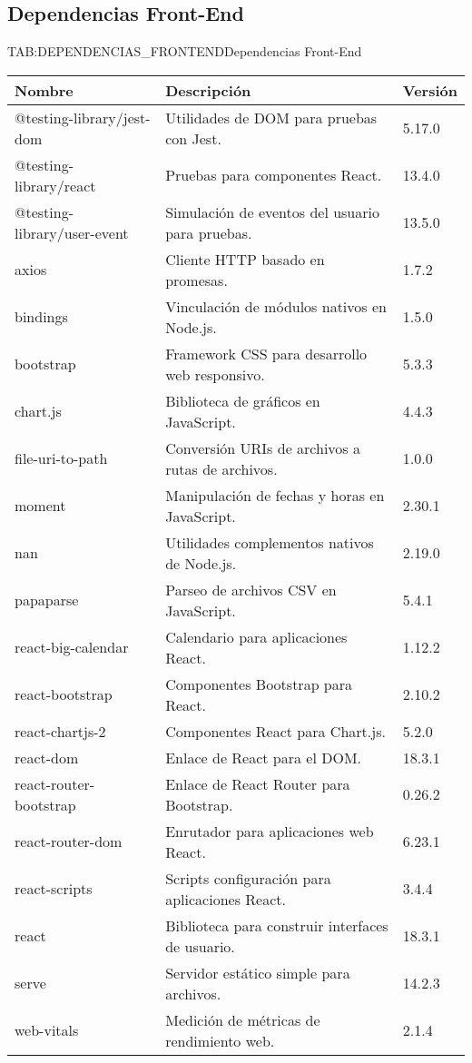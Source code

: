 \newpage

\subsection{Dependencias Front-End}

\begin{table}[Dependencias Front-End]{TAB:DEPENDENCIAS_FRONTEND}{Dependencias Front-End}
  \begin{tabular}{|p{6cm}|p{8cm}|p{2cm}|}
    \hline
    \textbf{Nombre} & \textbf{Descripción} & \textbf{Versión} \\
    \hline
    @testing-library/jest-dom & Utilidades de DOM para pruebas con Jest. & 5.17.0 \\
    \hline
    @testing-library/react & Pruebas para componentes React. & 13.4.0 \\
    \hline
    @testing-library/user-event & Simulación de eventos del usuario para pruebas. & 13.5.0 \\
    \hline
    axios & Cliente HTTP basado en promesas. & 1.7.2 \\
    \hline
    bindings & Vinculación de módulos nativos en Node.js. & 1.5.0 \\
    \hline
    bootstrap & Framework CSS para desarrollo web responsivo. & 5.3.3 \\
    \hline
    chart.js & Biblioteca de gráficos en JavaScript. & 4.4.3 \\
    \hline
    file-uri-to-path & Conversión URIs de archivos a rutas de archivos. & 1.0.0 \\
    \hline
    moment & Manipulación de fechas y horas en JavaScript. & 2.30.1 \\
    \hline
    nan & Utilidades complementos nativos de Node.js. & 2.19.0 \\
    \hline
    papaparse & Parseo de archivos CSV en JavaScript. & 5.4.1 \\
    \hline
    react-big-calendar & Calendario para aplicaciones React. & 1.12.2 \\
    \hline
    react-bootstrap & Componentes Bootstrap para React. & 2.10.2 \\
    \hline
    react-chartjs-2 & Componentes React para Chart.js. & 5.2.0 \\
    \hline
    react-dom & Enlace de React para el DOM. & 18.3.1 \\
    \hline
    react-router-bootstrap & Enlace de React Router para Bootstrap. & 0.26.2 \\
    \hline
    react-router-dom & Enrutador para aplicaciones web React. & 6.23.1 \\
    \hline
    react-scripts & Scripts configuración para aplicaciones React. & 3.4.4 \\
    \hline
    react & Biblioteca para construir interfaces de usuario. & 18.3.1 \\
    \hline
    serve & Servidor estático simple para archivos. & 14.2.3 \\
    \hline
    web-vitals & Medición de métricas de rendimiento web. & 2.1.4 \\
    \hline
  \end{tabular}
\end{table}

